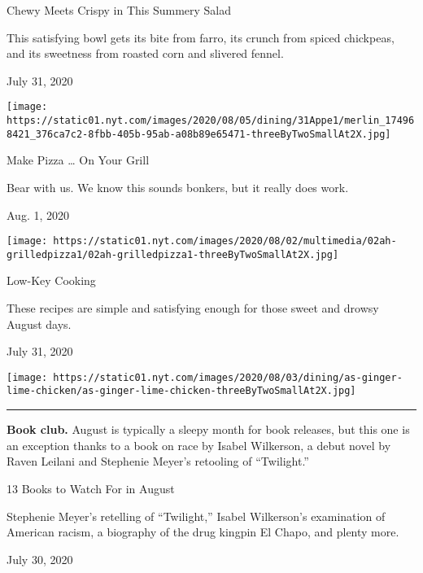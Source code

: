 Chewy Meets Crispy in This Summery Salad

This satisfying bowl gets its bite from farro, its crunch from spiced
chickpeas, and its sweetness from roasted corn and slivered fennel.

July 31, 2020

\texttt{[image: https://static01.nyt.com/images/2020/08/05/dining/31Appe1/merlin\_174968421\_376ca7c2-8fbb-405b-95ab-a08b89e65471-threeByTwoSmallAt2X.jpg]}

\href{https://www.nytimes.com/2020/08/01/at-home/coronavirus-make-pizza-on-a-grill.html?action=click\&module=RelatedLinks\&pgtype=collection}{}

Make Pizza \ldots{} On Your Grill

Bear with us. We know this sounds bonkers, but it really does work.

Aug. 1, 2020

\texttt{[image: https://static01.nyt.com/images/2020/08/02/multimedia/02ah-grilledpizza1/02ah-grilledpizza1-threeByTwoSmallAt2X.jpg]}

\href{https://www.nytimes.com/2020/07/31/dining/low-key-cooking.html?action=click\&module=RelatedLinks\&pgtype=collection}{}

Low-Key Cooking

These recipes are simple and satisfying enough for those sweet and
drowsy August days.

July 31, 2020

\texttt{[image: https://static01.nyt.com/images/2020/08/03/dining/as-ginger-lime-chicken/as-ginger-lime-chicken-threeByTwoSmallAt2X.jpg]}

\begin{center}\rule{0.5\linewidth}{\linethickness}\end{center}

\textbf{Book club.} August is typically a sleepy month for book
releases, but this one is an exception thanks to a book on race by
Isabel Wilkerson, a debut novel by Raven Leilani and Stephenie Meyer's
retooling of ``Twilight.''

\href{https://www.nytimes.com/2020/07/30/books/new-august-books.html?action=click\&module=RelatedLinks\&pgtype=collection}{}

13 Books to Watch For in August

Stephenie Meyer's retelling of ``Twilight,'' Isabel Wilkerson's
examination of American racism, a biography of the drug kingpin El
Chapo, and plenty more.

July 30, 2020

